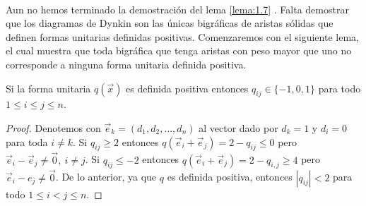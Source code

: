 \newpage
\paragraph{}
Aun no hemos terminado la demostración del lema \ref{lema:1.7} . Falta demostrar que los diagramas de Dynkin son las únicas bigráficas de aristas sólidas que definen formas unitarias definidas positivas. Comenzaremos con el siguiente lema, el cual muestra que toda bigráfica que tenga aristas con peso mayor que uno no corresponde a ninguna forma unitaria definida positiva.
\begin{lemma}
Si la forma unitaria $q(\overrightarrow{x})$ es definida positiva entonces $q_{ij} \in \{-1,0,1\}$ para todo $1\leq i \le j \leq n$.
\label{lema:1.8}
\end{lemma}
\begin{proof}
Denotemos con $ \overrightarrow{e}_{k} = \left(d_{1},d_{2}, \ldots , d_{n}\right)$ al vector dado por $d_{k} = 1$ y $d_{i} = 0$ para toda $i\neq k$. Si $q_{ij} \geq 2$ entonces $q(\overrightarrow{e}_{i} + \overrightarrow{e}_{j}) = 2 - q_{ij} \leq 0$ pero $\overrightarrow{e}_{i} - \overrightarrow{e}_{j} \neq \overrightarrow{0}, ~ i \neq j$. Si $q_{ij} \leq -2$ entonces $q\left(\overrightarrow{e}_{i}+ \overrightarrow{e}_{j}\right) = 2 - q_{i,j} \geq 4$ pero $\overrightarrow{e}_{i} - e_{j} \neq \overrightarrow{0}$. De lo anterior, ya que $q$ es definida positiva, entonces $|q_{ij}| < 2$ para todo $1 \leq i < j \leq n$.
\end{proof}
